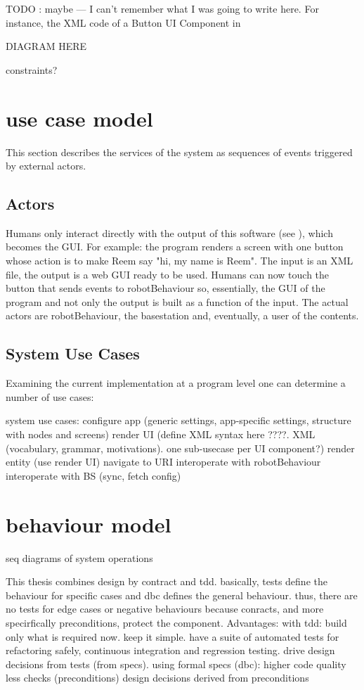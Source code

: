 TODO : maybe --- I can't remember what I was going to write here.
For instance, the \ac{XML} code of a Button UI Component in 



DIAGRAM HERE


constraints?

\section{use case model}
This section describes the services of the system as sequences of events triggered by external actors.

\subsection{Actors}
Humans only interact directly with the output of this software (see ), which becomes the \ac{GUI}.
For example: the program renders a screen with one button whose action is to make Reem say "hi, my name is Reem".
The input is an \ac{XML} file, the output is a web \ac{GUI} ready to be used.
Humans can now touch the button that sends events to robotBehaviour so, essentially, the \ac{GUI} of the program and not only the output is built as a function of the input.
The actual actors are robotBehaviour, the basestation and, eventually, a user of the contents.


\subsection{System Use Cases}
Examining the current implementation at a program level one can determine a number of use cases:


system use cases:
configure app (generic settings, app-specific settings, structure with nodes and screens)
render UI (define XML syntax here ????. XML (vocabulary, grammar, motivations). one sub-usecase per UI component?)
render entity (use render UI)
navigate to URI
interoperate with robotBehaviour 
interoperate with BS (sync, fetch config)

\section{behaviour model}
seq diagrams of system operations

This thesis combines design by contract and tdd. basically, tests define the behaviour for specific cases and dbc defines the general behaviour. thus, there are no tests for edge cases or negative behaviours because conracts, and more specirfically preconditions, protect the component.
Advantages:
with tdd:
build only what is required now. keep it simple.
have a suite of automated tests for refactoring safely, continuous integration and regression testing.
drive design decisions from tests (from specs).
using formal specs (dbc):
higher code quality
less checks (preconditions)
design decisions derived from preconditions

